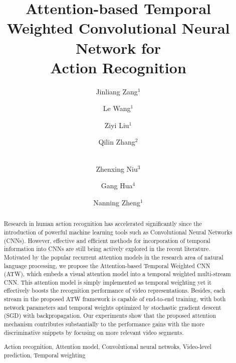 \documentclass[runningheads,a4paper]{llncs}
\newcommand{\keywords}[1]{\par\addvspace\baselineskip
\noindent\keywordname\enspace\ignorespaces#1}
\begin{document}
\mainmatter  %

\title{Attention-based Temporal Weighted Convolutional Neural Network for\\ Action Recognition}


\author{Jinliang Zang$^1$%
\and Le Wang$^1$\and Ziyi Liu$^1$\and Qilin Zhang$^2$\and \\Zhenxing Niu$^3$\and Gang Hua$^4$\and Nanning Zheng$^1$}






\maketitle


\begin{abstract}
Research in human action recognition has accelerated significantly since the introduction of powerful machine
learning tools such as Convolutional Neural Networks (CNNs). However, effective and efficient methods for
incorporation of temporal information into CNNs are still being actively explored in the recent literature.
Motivated by the popular recurrent attention models in the research area of natural language processing,
we propose the Attention-based Temporal Weighted CNN (ATW), which embeds a visual attention model into a
temporal weighted multi-stream CNN. This attention model is simply implemented as temporal weighting yet
it effectively boosts the recognition performance of video representations. Besides, each stream in the
proposed ATW framework is capable of end-to-end training, with both network parameters and temporal weights
optimized by stochastic gradient descent (SGD) with backpropagation. Our experiments show that the proposed
attention mechanism contributes substantially to the performance gains with the more discriminative snippets
by focusing on more relevant video segments.
\keywords{Action recognition, Attention model, Convolutional neural netwoks, Video-level
prediction, Temporal weighting}
\end{abstract}
\end{document}

